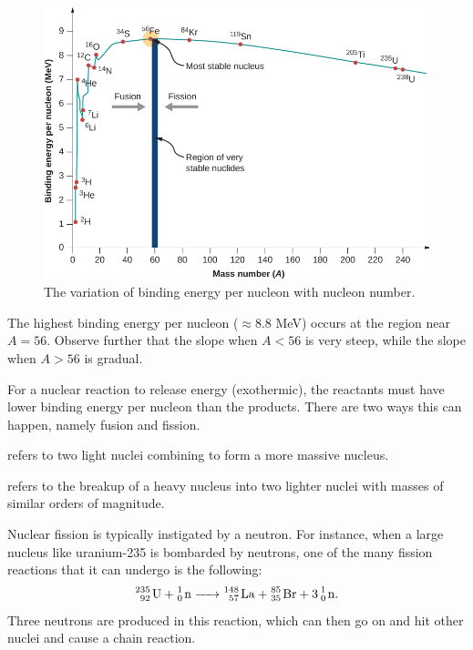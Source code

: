 \begin{figure}[H]
    \centering
    \includegraphics[scale=0.8]{media/Binding Energy Per Nucleon Variation.jpg}
    \caption{The variation of binding energy per nucleon with nucleon number.}
\end{figure}

The highest binding energy per nucleon ($\approx 8.8$ MeV) occurs at the region near $A = 56$. Observe further that the slope when $A < 56$ is very steep, while the slope when $A > 56$ is gradual.

For a nuclear reaction to release energy (exothermic), the reactants must have lower binding energy per nucleon than the products. There are two ways this can happen, namely fusion and fission.

\begin{definition}
     refers to two light nuclei combining to form a more massive nucleus.
\end{definition}

\begin{definition}
     refers to the breakup of a heavy nucleus into two lighter nuclei with masses of similar orders of magnitude.
\end{definition}

Nuclear fission is typically instigated by a neutron. For instance, when a large nucleus like uranium-235 is bombarded by neutrons, one of the many fission reactions that it can undergo is the following: \[\ce{^{235}_{92} U + ^1_0 n -> ^{148}_{57} La + ^{85}_{35} Br + 3 ^1_0 n}.\] Three neutrons are produced in this reaction, which can then go on and hit other nuclei and cause a chain reaction.

